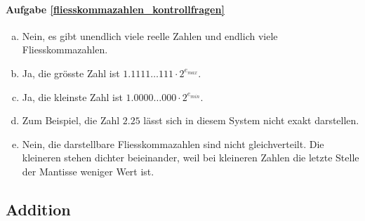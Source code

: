 \paragraph{Aufgabe \ref{fliesskommazahlen_kontrollfragen}}
\begin{enumerate}[(a)]
\item Nein, es gibt unendlich viele reelle Zahlen und endlich viele Fliesskommazahlen.
\item Ja, die grösste Zahl ist \(1.1111 \ldots 111 \cdot 2^{e_{max}}\).
\item Ja, die kleinste Zahl ist \(1.0000 \ldots 000 \cdot 2^{e_{min}}\).
\item Zum Beispiel, die Zahl \(2.25\) lässt sich in diesem System nicht exakt darstellen.
\item Nein, die darstellbare Fliesskommazahlen sind nicht gleichverteilt. Die kleineren stehen dichter beieinander, weil bei kleineren Zahlen die letzte Stelle der Mantisse weniger Wert ist.
\end{enumerate}


\subsection{Addition}
